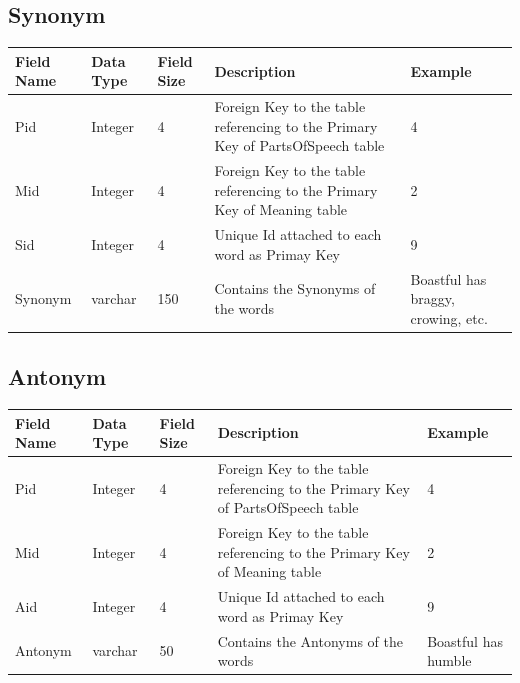 \documentclass{article}
\begin{document}
\subsection*{Synonym}
\begin{center}
\begin{tabular}{ |m{3em}|m{2em}|m{2.5em}|m{4cm}|m{2cm}| } 
 \hline
\large\textbf{Field Name} & \large\textbf{Data Type} & \large\textbf{Field Size} & \large\textbf{Description} & \large\textbf{Example}\\  
 \hline
\small Pid & \small Integer &\small 4 &\small Foreign Key to the table referencing to the Primary Key of PartsOfSpeech table &\small 4 \\
\hline
\small Mid & \small Integer &\small 4 &\small Foreign Key to the table referencing to the Primary Key of Meaning table &\small 2 \\
\hline
\small Sid & \small Integer &\small 4 &\small Unique Id attached to each word as Primay Key &\small 9 \\
\hline
\small Synonym & \small varchar &\small 150 &\small Contains the Synonyms of the words  &\small Boastful has braggy, crowing, etc.  \\
\hline
\end{tabular}
\end{center}

\pagebreak

\subsection*{Antonym}
\begin{center}
\begin{tabular}{ |m{3em}|m{3em}|m{2em}|m{5cm}|m{2.2cm}| } 
 \hline
\large\textbf{Field Name} & \large\textbf{Data Type} & \large\textbf{Field Size} & \large\textbf{Description} & \large\textbf{Example}\\  
 \hline
\small Pid & \small Integer &\small 4 &\small Foreign Key to the table referencing to the Primary Key of PartsOfSpeech table &\small 4 \\
\hline
\small Mid & \small Integer &\small 4 &\small Foreign Key to the table referencing to the Primary Key of Meaning table &\small 2 \\
\hline
\small Aid & \small Integer &\small 4 &\small Unique Id attached to each word as Primay Key &\small 9 \\
\hline
\small Antonym & \small varchar &\small 50 &\small Contains the Antonyms of the words  &\small Boastful has humble  \\
\hline
\end{tabular}
\end{center}
\end{document}
